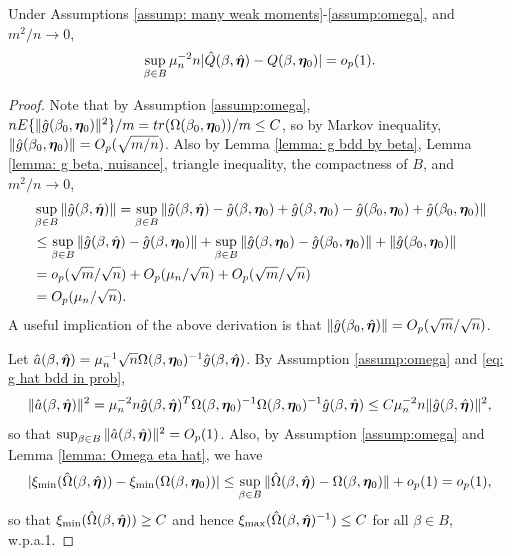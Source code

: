 \documentclass[12pt]{article}
\begin{document}
{\begin{lemma} \label{lemma:unif Q}
Under Assumptions \ref{assump: many weak moments}-\ref{assump:omega}, and  $ m^2/n\rightarrow 0 $,    $$ \sup_{\beta\in B} \mu_n^{-2} n  |\hat Q(\beta, \hat{\bm \eta}) - Q(\beta, \bm \eta_0) |= o_p(1).$$      
\end{lemma}
\begin{proof}
Note that by Assumption \ref{assump:omega}, $ n E\{\|\hat g (\beta_0, \bm \eta_0)\|^2 \}/m =  tr(\Omega(\beta_0, \bm \eta_0)) /m \leq C$, so by Markov inequality, $\|\hat g (\beta_0, \bm \eta_0)\|= O_p(\sqrt{m/n})$. Also by Lemma \ref{lemma: g bdd by beta}, Lemma \ref{lemma: g beta, nuisance},  triangle inequality, the compactness of $B$, and $ m^2/n\rightarrow 0 $, 
\begin{align}
   & \sup_{\beta\in B} \|\hat g(\beta, \hat{\bm \eta}) \|=  \sup_{\beta\in B} \|\hat g(\beta, \hat{\bm \eta}) -\hat g(\beta, \bm \eta_0) + \hat g(\beta, \bm \eta_0) - \hat g(\beta_0, \bm \eta_0) +\hat g(\beta_0, \bm \eta_0)\|\nonumber\\
    &\leq \sup_{\beta\in B} \|\hat g(\beta, \hat{\bm \eta}) -\hat g(\beta, \bm \eta_0) \|+  \sup_{\beta\in B} \| \hat g(\beta, \bm \eta_0) - \hat g(\beta_0, \bm \eta_0) \|+ \|\hat g(\beta_0, \bm \eta_0)\|\nonumber\\ 
    &= o_p(\sqrt{m}/\sqrt{n}) +  O_p(\mu_n/\sqrt{n})  +  O_p(\sqrt{m}/\sqrt{n})  \nonumber\\ 
  &=  O_p(\mu_n/\sqrt{n}).    \label{eq: g hat bdd in prob}
\end{align}
A useful implication of the above derivation is that $ \|\hat g(\beta_0, \hat{\bm \eta}) \| = O_p(\sqrt{m}/\sqrt{n}) $. 

Let $\hat a(\beta, \hat{\bm \eta})= \mu_n^{-1} \sqrt{n} \Omega(\beta, \bm \eta_0)^{-1}\hat g(\beta, \hat{\bm \eta}) $. By Assumption \ref{assump:omega} and \eqref{eq: g hat bdd in prob}, 
\begin{align*}
    \|\hat a(\beta, \hat{\bm \eta})\|^2= \mu_n^{-2} n \hat g(\beta, \hat{\bm \eta})^T \Omega(\beta, \bm \eta_0)^{-1}    \Omega(\beta, \bm \eta_0)^{-1}  \hat g(\beta, \hat{\bm \eta}) \leq C \mu_n^{-2} n \| \hat g(\beta, \hat{\bm \eta})\|^2,
\end{align*}
so that $\sup_{\beta\in B}  \|\hat a(\beta, \hat{\bm \eta})\|^2 = O_p(1) $. Also, by Assumption \ref{assump:omega} and Lemma \ref{lemma: Omega eta hat}, we have
\begin{align}
    |\xi_{\min}(\hat \Omega(\beta,\hat {\bm \eta}))-\xi_{\min}( \Omega(\beta, \bm \eta_0)) |\leq \sup_{\beta\in B } \|\hat \Omega(\beta, \hat {\bm \eta})- \Omega(\beta, \bm \eta_0) \| + o_p(1)= o_p(1), \label{eq: Omega hat bdd}
\end{align}
so that $\xi_{\min}(\hat \Omega(\beta, \hat{\bm \eta}))\geq C $ and hence $\xi_{\max}(\hat \Omega(\beta, \hat{\bm \eta})^{-1})\leq C $ for all $\beta\in B$, w.p.a.1.



\end{proof}}
\end{document}
